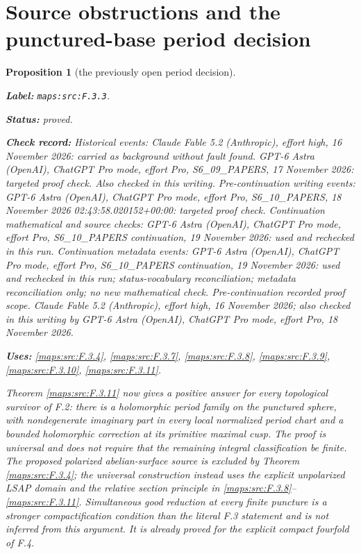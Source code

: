 \documentclass[11pt,a4paper]{article}
\newtheorem{proposition}[proposition]{Proposition}
\theoremstyle{definition}
\newcommand{\StatementRecord}[4]{\par\smallskip\begingroup\upshape\raggedright\noindent\textbf{Label:} \nolinkurl{#1}.\par\noindent\textbf{Status:} #2.\par\noindent\textbf{Check record:} #3.\par\noindent\textbf{Uses:} #4.\par\endgroup\smallskip}
\begin{document}
\section{Source obstructions and the punctured-base period decision}



\begin{proposition}[the previously open period decision]\label{maps:src:F.3.3}
\StatementRecord{maps:src:F.3.3}{proved}{Historical events: Claude Fable 5.2 (Anthropic), effort high, 16 November 2026: carried as background without fault found. GPT-6 Astra (OpenAI), ChatGPT Pro mode, effort Pro, S6\_09\_PAPERS, 17 November 2026: targeted proof check. Also checked in this writing. Pre-continuation writing events: GPT-6 Astra (OpenAI), ChatGPT Pro mode, effort Pro, S6\_10\_PAPERS, 18 November 2026 02:43:58.020152+00:00: targeted proof check. Continuation mathematical and source checks: GPT-6 Astra (OpenAI), ChatGPT Pro mode, effort Pro, S6\_10\_PAPERS continuation, 19 November 2026: used and rechecked in this run. Continuation metadata events: GPT-6 Astra (OpenAI), ChatGPT Pro mode, effort Pro, S6\_10\_PAPERS continuation, 19 November 2026: used and rechecked in this run; status-vocabulary reconciliation; metadata reconciliation only; no new mathematical check. \emph{Pre-continuation recorded proof scope.} Claude Fable 5.2 (Anthropic), effort high, 16 November 2026; also checked in this writing by GPT-6 Astra (OpenAI), ChatGPT Pro mode, effort Pro, 18 November 2026}{\cref{maps:src:F.3.4}, \cref{maps:src:F.3.7}, \cref{maps:src:F.3.8}, \cref{maps:src:F.3.9}, \cref{maps:src:F.3.10}, \cref{maps:src:F.3.11}}


Theorem \ref{maps:src:F.3.11} now gives a positive answer for every topological
survivor of F.2: there is a holomorphic period family on the
punctured sphere, with nondegenerate imaginary part in every
local normalized period chart and a bounded holomorphic
correction at its primitive maximal cusp.  The proof is universal
and does not require that the remaining integral classification
be finite.  The proposed polarized abelian-surface source is
excluded by Theorem \ref{maps:src:F.3.4}; the universal construction instead
uses the explicit unpolarized LSAP domain and the relative
section principle in \ref{maps:src:F.3.8}--\ref{maps:src:F.3.11}.  Simultaneous good reduction
at every finite puncture is a stronger compactification condition
than the literal F.3 statement and is not inferred from this
argument.  It is already proved for the explicit compact
fourfold of F.4.

\end{proposition}
\end{document}
